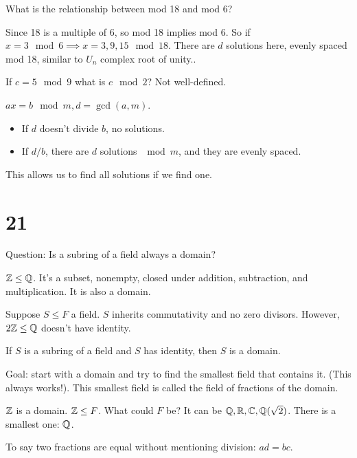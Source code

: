 \documentclass[class=article,crop=false]{standalone}
\begin{document}
What is the relationship between mod 18 and mod 6?

Since 18 is a multiple of 6, so mod 18 implies mod 6. So if $ x=3 \mod 6 \implies x=3, 9, 15 \mod 18$. There are $ d$ solutions here, evenly spaced mod 18, similar to  $ U_n$ complex root of unity..

If $ c=5 \mod 9$ what is $ c \mod 2$? Not well-defined.

\begin{coro}[20.13]
$ ax=b \mod m, d=\gcd ( a,m) $. 
\begin{itemize}
	\item If $ d$ doesn't divide $b$, no solutions.
	\item If  $ d / b$, there are  $ d$ solutions  $ \mod m$, and they are evenly spaced. 
\end{itemize}
\end{coro}
\begin{note}[]
	This allows us to find all solutions if we find one.
\end{note}

\section*{21}
Question: Is a subring of a field always a domain?
\begin{eg}[]
$ \mathbb{Z} \leq \mathbb{Q}$. It's a subset, nonempty, closed under addition, subtraction, and multiplication. It is also a domain.
\end{eg}

Suppose $ S \leq F$ a field.  $ S$ inherits commutativity and no zero divisors. However,  $ 2\mathbb{Z} \leq \mathbb{Q}$ doesn't have identity.

\begin{thm}[]
	If $ S$ is a subring of a field and  $ S$ has identity, then  $ S$ is a domain.
\end{thm}

Goal: start with a domain and try to find the smallest field that contains it. (This always works!). This smallest field is called the field of fractions of the domain.

\begin{eg}[]
	$ \mathbb{Z}$ is a domain. $ \mathbb{Z}\leq F$. What could $ F$ be? It can be  $ \mathbb{Q}, \mathbb{R}, \mathbb{C}, \mathbb{Q}(\sqrt{2} )$. There is a smallest one: $ \mathbb{Q}$. 
\end{eg}

To say two fractions are equal without mentioning division: $ ad=bc$.
\end{document}
